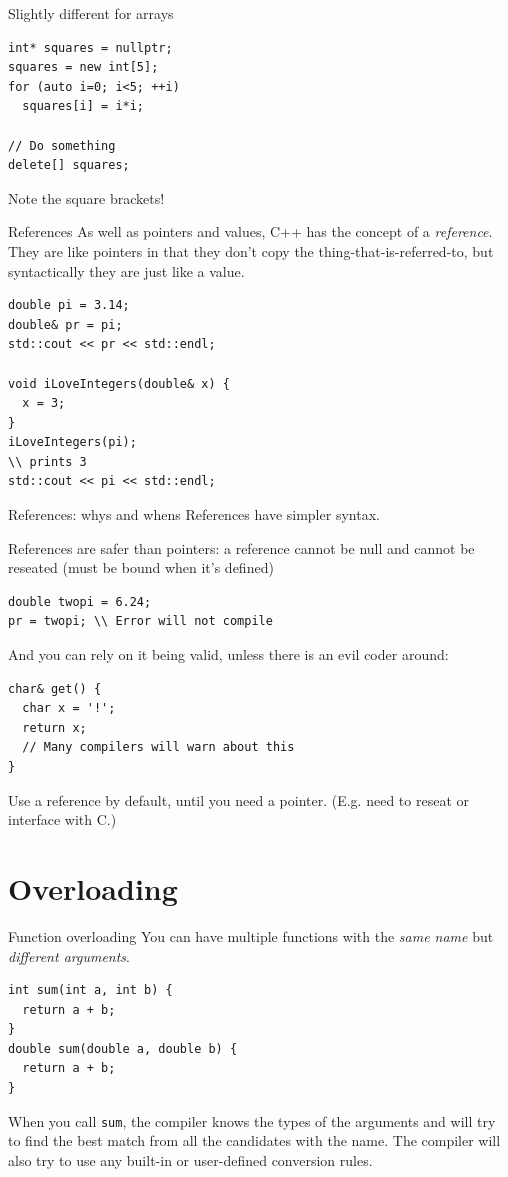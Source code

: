\documentclass[presentation,t]{beamer}
\newcommand{\code}[1]{\lstinline!#1!}
\begin{document}
\begin{frame}[fragile]{Slightly different for arrays}
\begin{lstlisting}
int* squares = nullptr;
squares = new int[5];
for (auto i=0; i<5; ++i)
  squares[i] = i*i;

// Do something
delete[] squares;
\end{lstlisting}

Note the square brackets!
\end{frame}

\begin{frame}[fragile]{References}
  As well as pointers and values, C++ has the concept of a
  \emph{reference}. They are like pointers in that they don't copy the
  thing-that-is-referred-to, but syntactically they are just like a value.

\begin{lstlisting}
double pi = 3.14;
double& pr = pi;
std::cout << pr << std::endl;

void iLoveIntegers(double& x) {
  x = 3;
}
iLoveIntegers(pi);
\\ prints 3
std::cout << pi << std::endl;
\end{lstlisting}
\end{frame}

\begin{frame}[fragile]{References: whys and whens}
References have simpler syntax.

References are safer than pointers: a reference cannot be null and
cannot be reseated (must be bound when it's defined)
\begin{lstlisting}
double twopi = 6.24;
pr = twopi; \\ Error will not compile
\end{lstlisting}

And you can rely on it being valid, unless there is an
evil coder around:
\begin{lstlisting}
char& get() {
  char x = '!';
  return x;
  // Many compilers will warn about this
}
\end{lstlisting}

Use a reference by default, until you need a pointer. (E.g. need to
reseat or interface with C.)
\end{frame}

\section{Overloading}
\begin{frame}[fragile]{Function overloading}
  You can have multiple functions with the \emph{same name} but
  \emph{different arguments}.
  
\begin{lstlisting}
int sum(int a, int b) {
  return a + b;
}
double sum(double a, double b) {
  return a + b;
}
\end{lstlisting}

  When you call \code{sum}, the compiler knows the types of the
  arguments and will try to find the best match from all the
  candidates with the name.
  \vfill{}
  The compiler will also try to use any built-in or user-defined
  conversion rules.
\end{frame}
\end{document}

